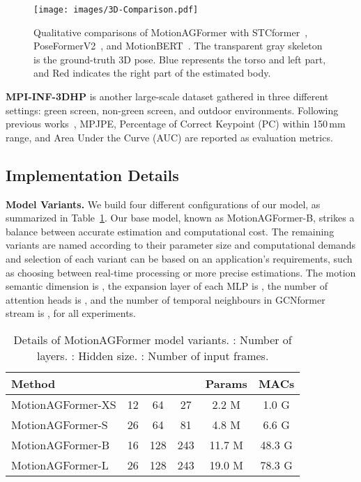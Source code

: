 \documentclass[10pt,twocolumn,letterpaper]{article}
\begin{document}
\begin{figure*}
  \centering
  \texttt{[image: images/3D-Comparison.pdf]}
  \caption{Qualitative comparisons of MotionAGFormer with STCformer~\cite{STCFormer}, PoseFormerV2~\cite{poseformerv2}, and MotionBERT~\cite{motionbert}. The transparent gray skeleton is the ground-truth 3D pose. Blue represents the torso and left part, and Red indicates the right part of the estimated body.}
  \label{fig:qualitative-comparison}
\end{figure*}
    

    
    \textbf{MPI-INF-3DHP} is another large-scale dataset gathered in three different settings: green screen, non-green screen, and outdoor environments. Following  previous works~\cite{poseformerv2, STCFormer}, MPJPE, Percentage of Correct Keypoint (PC) within 150\,mm range, and Area Under the Curve (AUC) are reported as evaluation metrics.
    \subsection{Implementation Details}
    \textbf{Model Variants.} We build four different configurations of our model, as summarized in Table~\ref{tab:variants}. Our base model, known as  MotionAGFormer-B, strikes a balance between accurate estimation and computational cost. The remaining variants are named according to their parameter size and computational demands and selection of each variant can be based on an application's requirements, such as choosing between real-time processing or more precise estimations. The motion semantic dimension is , the expansion layer of each MLP is , the number of attention heads is , and the number of temporal neighbours in GCNformer stream is , for all experiments.

    \begin{table}[h]\small
        \caption{Details of MotionAGFormer model variants. : Number of layers. : Hidden size. : Number of input frames.}
            \begin{tabular}{lccccc}
                \toprule
                Method &  &  &  & Params & MACs \\
                \midrule
                MotionAGFormer-XS & 12 & 64 & 27 & 2.2 M & 1.0 G \\
                MotionAGFormer-S & 26 & 64 & 81 & 4.8 M & 6.6 G \\
                MotionAGFormer-B & 16 & 128 & 243 & 11.7 M & 48.3 G\\
                MotionAGFormer-L & 26 & 128 & 243 & 19.0 M & 78.3 G \\
                \bottomrule
            \end{tabular}\label{tab:variants}
    \end{table}
\end{document}
